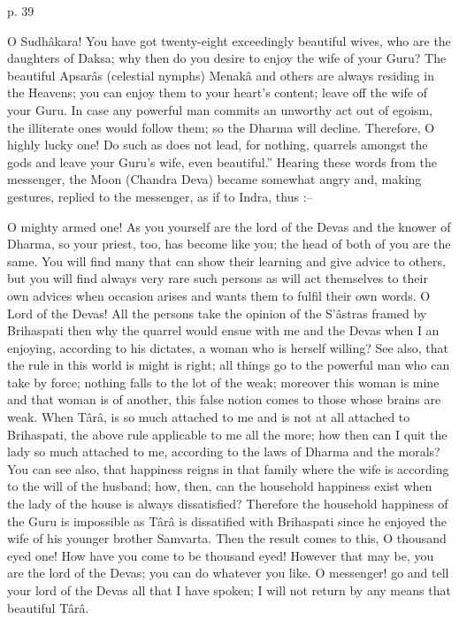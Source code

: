  

p. 39

 

O Sudhâkara! You have got twenty-eight exceedingly beautiful wives, who are the daughters of Daksa; why then do you desire to enjoy the wife of your Guru? The beautiful Apsarâs (celestial nymphs) Menakâ and others are always residing in the Heavens; you can enjoy them to your heart's content; leave off the wife of your Guru. In case any powerful man commits an unworthy act out of egoism, the illiterate ones would follow them; so the Dharma will decline. Therefore, O highly lucky one! Do such as does not lead, for nothing, quarrels amongst the gods and leave your Guru's wife, even beautiful.” Hearing these words from the messenger, the Moon (Chandra Deva) became somewhat angry and, making gestures, replied to the messenger, as if to Indra, thus :--

 

O mighty armed one! As you yourself are the lord of the Devas and the knower of Dharma, so your priest, too, has become like you; the head of both of you are the same. You will find many that can show their learning and give advice to others, but you will find always very rare such persons as will act themselves to their own advices when occasion arises and wants them to fulfil their own words. O Lord of the Devas! All the persons take the opinion of the S'âstras framed by Brihaspati then why the quarrel would ensue with me and the Devas when I an enjoying, according to his dictates, a woman who is herself willing? See also, that the rule in this world is might is right; all things go to the powerful man who can take by force; nothing falls to the lot of the weak; moreover this woman is mine and that woman is of another, this false notion comes to those whose brains are weak. When Târâ, is so much attached to me and is not at all attached to Brihaspati, the above rule applicable to me all the more; how then can I quit the lady so much attached to me, according to the laws of Dharma and the morals? You can see also, that happiness reigns in that family where the wife is according to the will of the husband; how, then, can the household happiness exist when the lady of the house is always dissatisfied? Therefore the household happiness of the Guru is impossible as Târâ is dissatified with Brihaspati since he enjoyed the wife of his younger brother Samvarta. Then the result comes to this, O thousand eyed one! How have you come to be thousand eyed! However that may be, you are the lord of the Devas; you can do whatever you like. O messenger! go and tell your lord of the Devas all that I have spoken; I will not return by any means that beautiful Târâ.

